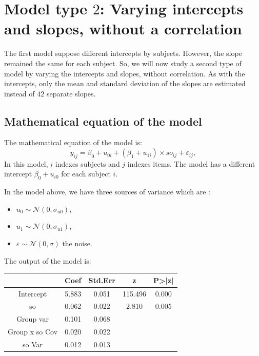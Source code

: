 \documentclass{article}
\begin{document}

\section{Model type $2$: Varying intercepts and slopes, without a correlation}

The first model suppose different intercepts by subjects. However, the slope remained the same for each subject. So, we will now study a second type of model by varying the intercepts and slopes, without correlation. 
As with the intercepts, only the mean and standard deviation of the slopes are estimated instead of $42$ separate slopes.

\subsection{Mathematical equation of the model}
The mathematical equation of the model is:
\[y_{ij}= \beta_0 + u_{0i} + (\beta_1 + u_{1i}) \times so_{ij} + \varepsilon_{ij},\]
In this model, $i$ indexes subjects and $j$ indexes items.
The model has a different intercept $\beta_0 + u_{i0}$ for each subject $i$.

In the model above, we have three sources of variance which are :
\begin{itemize}
    \item $u_0 \sim \mathcal{N}(0,\sigma_{u0})$,
    \item $u_1 \sim \mathcal{N}(0,\sigma_{u1})$,
    \item $\varepsilon \sim \mathcal{N}(0, \sigma)$ the noise.
\end{itemize}

The output of the model is:
\begin{center}
    \begin{tabular}{|c|c|c|c|c|}
    \hline
         & Coef & Std.Err & z & P>|z|   \\
         \hline \hline
        Intercept & 5.883 & 0.051 & 115.496 & 0.000\\
         so & 0.062 & 0.022 & 2.810 & 0.005  \\
         Group var &  0.101 & 0.068 &  & \\
         Group x so Cov & 0.020 & 0.022 & & \\
         so Var & 0.012 & 0.013 & & \\
         \hline
    \end{tabular}
\end{center}
\end{document}
